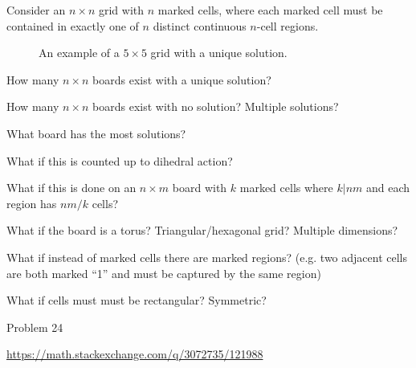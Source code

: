 \documentclass{article}
\begin{document}
  Consider an $n \times n$ grid with $n$ marked cells, where each marked cell
  must be contained in exactly one of $n$ distinct continuous $n$-cell regions.
\begin{figure}[ht!]
  \centering
  \caption{
    An example of a $5 \times 5$ grid with a unique solution.
  }
\end{figure}

\begin{question}
  How many $n \times n$ boards exist with a unique solution?
\end{question}

\begin{related}
  \item How many $n \times n$ boards exist with no solution? Multiple solutions?
  \item What board has the most solutions?
  \item What if this is counted up to dihedral action?
  \item What if this is done on an $n \times m$ board with $k$ marked cells where
  $k | nm$ and each region has $nm/k$ cells?
  \item What if the board is a torus? Triangular/hexagonal grid? Multiple dimensions?
  \item What if instead of marked cells there are marked regions? (e.g. two
  adjacent cells are both marked ``1'' and must be captured by the same region)
  \item What if cells must must be rectangular? Symmetric?
\end{related}


\begin{references}
  \item Problem 24
  \item \url{https://math.stackexchange.com/q/3072735/121988}
\end{references}
\end{document}
